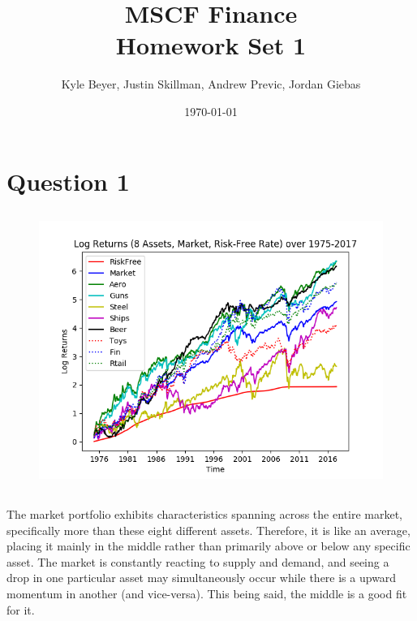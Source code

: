 \documentclass[12pt]{article}
\title{MSCF Finance\\ Homework Set 1}
\author{
        Kyle Beyer, 
        Justin Skillman,
        Andrew Previc,
        Jordan Giebas
}
\date{\today}
\begin{document}
\maketitle

\section{Question 1}

	\subsection{}

		\begin{figure}[h]
		\centering
			\includegraphics[scale=0.75]{hw1_image1.png}
		\end{figure}

	\subsection{}
		
		The market portfolio exhibits characteristics spanning across the entire market, specifically more than these eight different assets. Therefore,
		it is like an average, placing it mainly in the middle rather than primarily above or below any specific asset. The market is constantly reacting to 
		supply and demand, and seeing a drop in one particular asset may simultaneously occur while there is a upward momentum in another (and vice-versa). 
		This being said, the middle is a good fit for it. 
		
	\subsection{}
	
\end{document}
